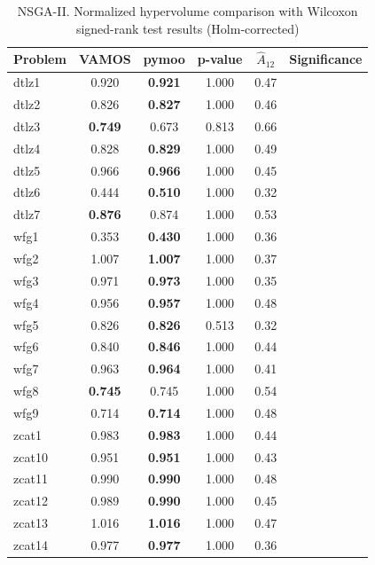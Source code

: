 \documentclass[journal]{IEEEtran}
\newcommand{\xmark}{\ding{55}}
\begin{document}
\begin{table}[htbp]
\centering
\caption{NSGA-II. Normalized hypervolume comparison with Wilcoxon signed-rank test results (Holm-corrected)}
\label{tab:stats_hypervolume_nsgaii}
\begin{tabular}{lccccc}
\toprule
\textbf{Problem} & \textbf{VAMOS} & \textbf{pymoo} & \textbf{p-value} & \textbf{$\hat{A}_{12}$} & \textbf{Significance} \\
\midrule
dtlz1 & 0.920 & \textbf{0.921} & 1.000 & 0.47 & \xmark \\
dtlz2 & 0.826 & \textbf{0.827} & 1.000 & 0.46 & \xmark \\
dtlz3 & \textbf{0.749} & 0.673 & 0.813 & 0.66 & \xmark \\
dtlz4 & 0.828 & \textbf{0.829} & 1.000 & 0.49 & \xmark \\
dtlz5 & 0.966 & \textbf{0.966} & 1.000 & 0.45 & \xmark \\
dtlz6 & 0.444 & \textbf{0.510} & 1.000 & 0.32 & \xmark \\
dtlz7 & \textbf{0.876} & 0.874 & 1.000 & 0.53 & \xmark \\
wfg1 & 0.353 & \textbf{0.430} & 1.000 & 0.36 & \xmark \\
wfg2 & 1.007 & \textbf{1.007} & 1.000 & 0.37 & \xmark \\
wfg3 & 0.971 & \textbf{0.973} & 1.000 & 0.35 & \xmark \\
wfg4 & 0.956 & \textbf{0.957} & 1.000 & 0.48 & \xmark \\
wfg5 & 0.826 & \textbf{0.826} & 0.513 & 0.32 & \xmark \\
wfg6 & 0.840 & \textbf{0.846} & 1.000 & 0.44 & \xmark \\
wfg7 & 0.963 & \textbf{0.964} & 1.000 & 0.41 & \xmark \\
wfg8 & \textbf{0.745} & 0.745 & 1.000 & 0.54 & \xmark \\
wfg9 & 0.714 & \textbf{0.714} & 1.000 & 0.48 & \xmark \\
zcat1 & 0.983 & \textbf{0.983} & 1.000 & 0.44 & \xmark \\
zcat10 & 0.951 & \textbf{0.951} & 1.000 & 0.43 & \xmark \\
zcat11 & 0.990 & \textbf{0.990} & 1.000 & 0.48 & \xmark \\
zcat12 & 0.989 & \textbf{0.990} & 1.000 & 0.45 & \xmark \\
zcat13 & 1.016 & \textbf{1.016} & 1.000 & 0.47 & \xmark \\
zcat14 & 0.977 & \textbf{0.977} & 1.000 & 0.36 & \xmark \\

\end{tabular}
\end{table}
\end{document}
